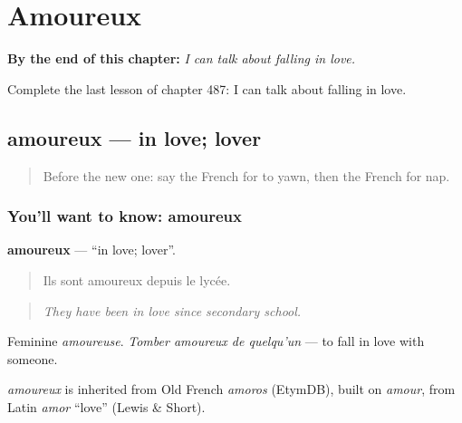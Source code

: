 
\chapter{Amoureux}
\label{ch:fr-amoureux}

\begin{chapteropening}
\textbf{By the end of this chapter:} \emph{I can talk about falling in love.}

Complete the last lesson of chapter 487: I can talk about falling in love.
\end{chapteropening}

\section[amoureux]{amoureux — in love; lover}

\label{lesson:FR-C487-amoureux}



\begin{quote}
Before the new one: say the French for to yawn, then the French for nap.
\end{quote}

\subsection*{You'll want to know: amoureux}
\textbf{amoureux} — \textquotedblleft{}in love; lover\textquotedblright{}.

\begin{quote}
Ils sont amoureux depuis le lycée.
\end{quote}

\begin{quote}
\emph{They have been in love since secondary school.}
\end{quote}

Feminine \emph{amoureuse}. \emph{Tomber amoureux de quelqu'un} — to fall in love with someone.

\begin{cousinweb}
\emph{amoureux} is inherited from Old French \emph{amoros} (EtymDB), built on \emph{amour}, from Latin \emph{amor} \textquotedblleft{}love\textquotedblright{} (Lewis \& Short).
\end{cousinweb}

